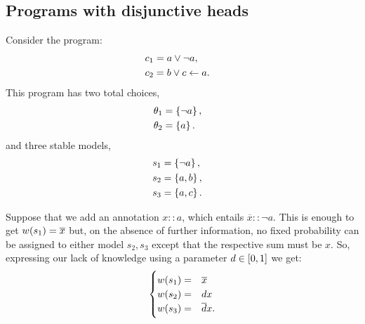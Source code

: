 \documentclass{beamer}
\newcommand{\larr}{\ensuremath{\leftarrow}}
\newcommand{\at}[1]{\ensuremath{\!\del{#1}}}
\newcommand{\co}[1]{\ensuremath{\overline{#1}}}
\begin{document}
\subsection{Programs with disjunctive heads}
\begin{frame}
    
    Consider the program:
    $$
    \begin{aligned}
    c_1 &= a \lor \neg a, \cr
    c_2 &= b \lor c \larr a.
    \end{aligned}
    $$
    This program has two total choices,
    $$
    \begin{aligned}
    \theta_1&= \set{ \neg a }, \cr
    \theta_2&= \set{ a }.
    \end{aligned}
    $$
    and three stable models,
    $$
    \begin{aligned}
    s_1 &= \set{ \neg a }, \cr
    s_2 &= \set{ a, b }, \cr
    s_3 &= \set{ a, c }.
    \end{aligned}
    $$
\end{frame}
\begin{frame}
    Suppose that we add an annotation $x :: a$, which entails $\co{x} :: \neg a$. This is enough to get $w\at{s_1} = \co{x}$ but, on the absence of further information, no fixed probability can be assigned to either model $s_2, s_3$ except that the respective sum must be $x$. So, expressing our lack of knowledge using a parameter $d \in \intcc{0, 1}$ we get:
    $$
    \begin{cases}
        w\at{s_1 } = &\co{x}\cr
        w\at{s_2 } = &dx\cr
        w\at{s_3} = &\co{d}x.
    \end{cases}
    $$
\end{frame}
\end{document}
